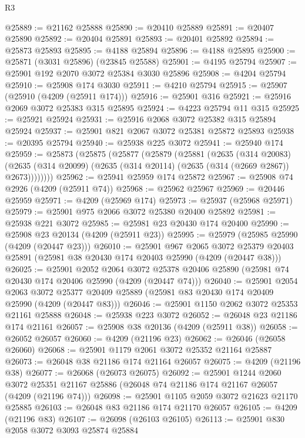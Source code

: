 \begin{lexlean}{R3}
\begin{coremodule}
@25889 := @21162 @25888
@25890 := @20410 @25889
@25891 := @20407 @25890
@25892 := @20404 @25891
@25893 := @20401 @25892
@25894 := @25873 @25893
@25895 := @4188 @25894
@25896 := @4188 @25895
@25900 := @25871 (@3031 @25896) (@23845 @25588)
@25901 := @4195 @25794
@25907 := @25901 @192 @2070 @3072 @25384 @3030 @25896
@25908 := @4204 @25794
@25910 := @25908 @174 @3030
@25911 := @4210 @25794
@25915 := @25907 (@25910 (@4209 (@25911 @174)))
@25916 := @25901 @316
@25921 := @25916 @2069 @3072 @25383 @315 @25895
@25924 := @4223 @25794 @11 @315
@25925 := @25921 @25924
@25931 := @25916 @2068 @3072 @25382 @315 @25894 @25924
@25937 := @25901 @821 @2067 @3072 @25381 @25872 @25893
@25938 := @20395 @25794
@25940 := @25938 @225 @3072
@25941 := @25940 @174
@25959 := @25873
    (@25875
      (@25877
        (@25879
          (@25881
            (@2635
              (@314 @20083)
              (@2635 (@314 @20099) (@2635 (@314 @20114) (@2635 (@314 (@2669 @2867)) @2673))))))))
@25962 := @25941 @25959 @174 @25872
@25967 := @25908 @74 @2926 (@4209 (@25911 @74))
@25968 := @25962 @25967
@25969 := @20446 @25959
@25971 := @4209 (@25969 @174)
@25973 := @25937 (@25968 @25971)
@25979 := @25901 @975 @2066 @3072 @25380 @20400 @25892
@25981 := @25938 @221 @3072
@25985 := @25981 @23 @20430 @174 @20400
@25990 := @25908 @23 @20134 (@4209 (@25911 @23))
@25995 := @25979 (@25985 @25990 (@4209 (@20447 @23)))
@26010 := @25901
    @967
    @2065
    @3072
    @25379
    @20403
    @25891
    (@25981 @38 @20430 @174 @20403 @25990 (@4209 (@20447 @38)))
@26025 := @25901
    @2052
    @2064
    @3072
    @25378
    @20406
    @25890
    (@25981 @74 @20430 @174 @20406 @25990 (@4209 (@20447 @74)))
@26040 := @25901
    @2054
    @2063
    @3072
    @25377
    @20409
    @25889
    (@25981 @83 @20430 @174 @20409 @25990 (@4209 (@20447 @83)))
@26046 := @25901 @1150 @2062 @3072 @25353 @21161 @25888
@26048 := @25938 @223 @3072
@26052 := @26048 @23 @21186 @174 @21161
@26057 := @25908 @38 @20136 (@4209 (@25911 @38))
@26058 := @26052 @26057
@26060 := @4209 (@21196 @23)
@26062 := @26046 (@26058 @26060)
@26068 := @25901 @1179 @2061 @3072 @25352 @21164 @25887
@26073 := @26048 @38 @21186 @174 @21164 @26057
@26075 := @4209 (@21196 @38)
@26077 := @26068 (@26073 @26075)
@26092 := @25901
    @1244
    @2060
    @3072
    @25351
    @21167
    @25886
    (@26048 @74 @21186 @174 @21167 @26057 (@4209 (@21196 @74)))
@26098 := @25901 @1105 @2059 @3072 @21623 @21170 @25885
@26103 := @26048 @83 @21186 @174 @21170 @26057
@26105 := @4209 (@21196 @83)
@26107 := @26098 (@26103 @26105)
@26113 := @25901 @830 @2058 @3072 @3093 @25874 @25884

\end{coremodule}
\end{lexlean}
